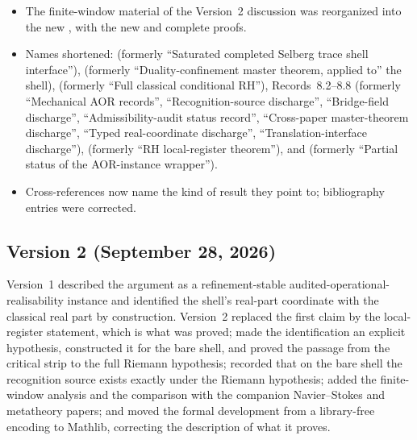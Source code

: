 \documentclass[11pt]{article}
\theoremstyle{definition}
\begin{document}
\begin{itemize}
    includes the non-emptiness of the non-claim list.  The section was
    renamed ``A classification of the hypotheses''.
  \item The finite-window material of the Version~2 discussion was
    reorganized into the new , with the new
    and complete proofs.
  \item Names shortened:  (formerly
    ``Saturated completed Selberg trace shell interface''),
     (formerly ``Duality-confinement
    master theorem, applied to'' the shell),
     (formerly ``Full classical conditional
    RH''), Records~8.2--8.8 (formerly ``Mechanical AOR records'',
    ``Recognition-source discharge'', ``Bridge-field discharge'',
    ``Admissibility-audit status record'', ``Cross-paper master-theorem
    discharge'', ``Typed real-coordinate discharge'',
    ``Translation-interface discharge''),  (formerly ``RH local-register theorem''),
    and  (formerly ``Partial status of
    the AOR-instance wrapper'').
  \item Cross-references now name the kind of result they point to;
    bibliography entries were corrected.
\end{itemize}

\subsection*{Version 2 (September 28, 2026)}

Version~1 described the argument as a refinement-stable
audited-operational-realisability instance and identified the shell's
real-part coordinate with the classical real part by construction.
Version~2 replaced the first claim by the local-register statement,
which is what was proved; made the identification an explicit
hypothesis, constructed it for the bare shell, and proved the passage
from the critical strip to the full Riemann hypothesis; recorded that on
the bare shell the recognition source exists exactly under the Riemann
hypothesis; added the finite-window analysis and the comparison with
the companion Navier--Stokes and metatheory papers; and moved the formal
development from a library-free encoding to Mathlib, correcting the
description of what it proves.
\par\endgroup
\end{document}
